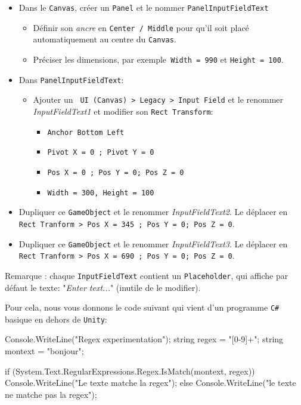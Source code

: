 \documentclass[a4paper,10pt]{article}
\newenvironment{solution}%
{\begin{tcolorbox}[breakable,colback=red!5!white,colframe=red!75!black,title=Solution]}%
{\end{tcolorbox}}
\newenvironment{boxcode}%
{\begin{tcolorbox}[breakable,colback=gray!5!white,colframe=black]}%
	{\end{tcolorbox}}
\begin{document}
\ifversionenseignant
\begin{solution}
	\begin{itemize}
		\item Dans le \texttt{Canvas}, créer un \texttt{Panel} et le nommer \texttt{PanelInputFieldText}
		\begin{itemize}
			\item Définir son \textit{ancre} en \texttt{Center / Middle} pour qu'il soit placé automatiquement au centre du \texttt{Canvas}.
			\item Préciser les dimensions, par exemple\texttt{ Width = 990} et \texttt{Height = 100}.
		\end{itemize}
	\item Dans  \texttt{PanelInputFieldText}:
	\begin{itemize}
		\item Ajouter un \texttt{ UI (Canvas) > Legacy > Input Field} et le renommer \textit{InputFieldText1} et modifier son \texttt{Rect Transform}:
		\begin{itemize}
			\item \texttt{Anchor Bottom Left}
			\item \texttt{Pivot X = 0 ; Pivot Y = 0}
			\item \texttt{Pos X = 0 ; Pos Y = 0; Pos Z = 0}
			\item \texttt{Width = 300, Height = 100}
		\end{itemize}
		\end{itemize}
		\item Dupliquer ce \texttt{GameObject} et le renommer \textit{InputFieldText2}. Le déplacer en \texttt{Rect Tranform > Pos X = 345 ; Pos Y = 0; Pos Z = 0}.
		\item Dupliquer ce \texttt{GameObject} et le renommer \textit{InputFieldText3}. Le déplacer en \texttt{Rect Tranform > Pos X = 690 ; Pos Y = 0; Pos Z = 0}.		
		
	\end{itemize}

Remarque : chaque \texttt{InputFieldText} contient un \texttt{Placeholder}, qui affiche par défaut le texte: "\textit{Enter text...}" (inutile de le modifier).
\end{solution}	
\fi 

Pour cela, nous vous donnons le code suivant qui vient d'un programme \texttt{C\#} basique en dehors de \texttt{Unity}:

\begin{boxcode}
\begin{csharpsansbord}
Console.WriteLine("Regex experimentation");
string regex = "[0-9]+";
string montext = "bonjour";

if (System.Text.RegularExpressions.Regex.IsMatch(montext, regex))
	Console.WriteLine("Le texte matche la regex");
else
	Console.WriteLine("le texte ne matche pas la regex");

\end{csharpsansbord}
\end{boxcode}
\end{document}
